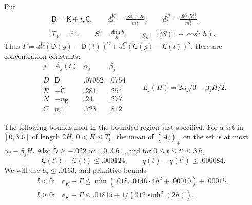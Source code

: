 Put
\[
\begin{gathered}
 \mathsf D=\mathsf K+t_c\mathsf C,\qquad
 d_*^K=\frac{.80\cdot1.25}{m_*^2},\qquad
 d_*^C=\frac{.80\cdot5t_r^2}{m_*^2},\\
 T_0=.54,\qquad S=\frac{\sinh h}{h},\qquad
 g_h=\frac34S(1+\cosh h).
\end{gathered}
\]
Thus \(\Gamma=d_*^K(\mathsf D(y)-\mathsf D(l))^2+d_*^C(\mathsf C(y)-\mathsf C(l))^2\).
Here are concentration constants:
\[
\begin{array}{c|c|cc}
 j & A_j(t)& \alpha_j&\beta_j\\\hline
 D&\dot{\mathsf D}&.07052&.0754\\
 E&-\dot{\mathsf C}&.281&.254\\
 N&-n_{\mathsf K}&.24&.277\\
 C& n_{\mathsf C}&.728&.812
\end{array}
\qquad L_j(H)=2\alpha_j/3-\beta_j H/2.
\]
\begin{lemma}\label{lem:segment-auxiliary}
The following bounds hold in the bounded region just specified. For a set in \([0,3.6]\) of length \(2H\), \(0<H\le T_0\), the mean of \((A_j)_+\) on the set is at most \(\alpha_j-\beta_j H\). Also \(\dot{\mathsf D}\ge-.022\) on \([0,3.6]\), and for \(0\le t\le t'\le3.6\),
\[
 \mathsf C(t')-\mathsf C(t)\le .000124,\qquad q(t)-q(t')\le .000084 .
\]
We will use \(b_a\le .0163\), and primitive bounds
\[
\begin{array}{ll}
 l<0: & e_K+\Gamma\le \min(.018,.0146\cdot4 h^2+.00010)+.00015,\\
 l\ge0: & e_K+\Gamma\le .01815+1/(312\sinh^2(2h)).
\end{array}                                                               \tag{s1}\label{eq:s1}
\]

\end{lemma}
